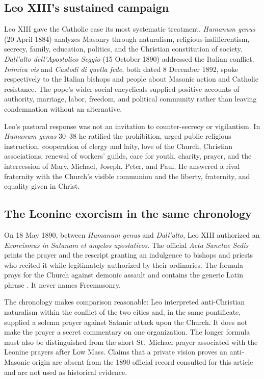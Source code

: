 \subsection{Leo XIII's sustained campaign}

Leo XIII gave the Catholic case its most systematic treatment. \emph{Humanum genus} (20 April 1884) analyzes Masonry through naturalism, religious indifferentism, secrecy, family, education, politics, and the Christian constitution of society. \emph{Dall'alto dell'Apostolico Seggio} (15 October 1890) addressed the Italian conflict. \emph{Inimica vis} and \emph{Custodi di quella fede}, both dated 8 December 1892, spoke respectively to the Italian bishops and people about Masonic action and Catholic resistance. The pope's wider social encyclicals supplied positive accounts of authority, marriage, labor, freedom, and political community rather than leaving condemnation without an alternative.

Leo's pastoral response was not an invitation to counter-secrecy or vigilantism. In \emph{Humanum genus} 30--38 he ratified the prohibition, urged public religious instruction, cooperation of clergy and laity, love of the Church, Christian associations, renewal of workers' guilds, care for youth, charity, prayer, and the intercession of Mary, Michael, Joseph, Peter, and Paul. He answered a rival fraternity with the Church's visible communion and the liberty, fraternity, and equality given in Christ.

\subsection{The Leonine exorcism in the same chronology}

On 18 May 1890, between \emph{Humanum genus} and \emph{Dall'alto}, Leo XIII authorized an \emph{Exorcismus in Satanam et angelos apostaticos}. The official \emph{Acta Sanctae Sedis} prints the prayer and the rescript granting an indulgence to bishops and priests who recited it while legitimately authorized by their ordinaries. The formula prays for the Church against demonic assault and contains the generic Latin phrase . It never names Freemasonry.

The chronology makes comparison reasonable: Leo interpreted anti-Christian naturalism within the conflict of the two cities and, in the same pontificate, supplied a solemn prayer against Satanic attack upon the Church. It does not make the prayer a secret commentary on one organization. The longer formula must also be distinguished from the short St.~Michael prayer associated with the Leonine prayers after Low Mass. Claims that a private vision proves an anti-Masonic origin are absent from the 1890 official record consulted for this article and are not used as historical evidence.

